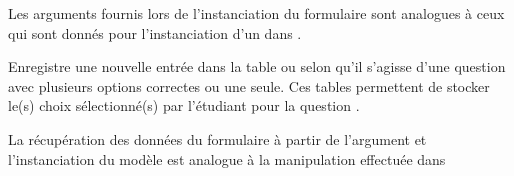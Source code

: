\documentclass[a4,10pt,french]{sphinxmanual}
\begin{document}
\begin{fulllineitems}
\begin{fulllineitems}
Les arguments fournis lors de l'instanciation du formulaire sont analogues
à ceux qui sont donnés pour l'instanciation d'un  dans .

\end{fulllineitems}


\begin{fulllineitems}
\label{database:quiz.models.Qcm.save_submit}
Enregistre une nouvelle entrée dans la table 
ou  selon qu'il s'agisse d'une question avec
plusieurs options correctes ou une seule. Ces tables permettent de stocker
le(s) choix sélectionné(s) par l'étudiant pour la question .

La récupération des données du formulaire à partir de l'argument 
et l'instanciation du modèle est analogue à la manipulation effectuée dans 

\end{fulllineitems}


\end{fulllineitems}

\end{document}
